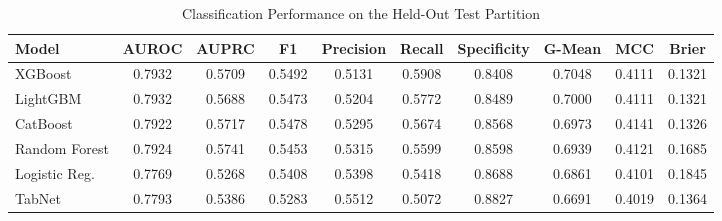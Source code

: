 \begin{table}
\centering
\caption{Classification Performance on the Held-Out Test Partition}
\label{tab:results}
\begin{tabular}{lccccccccc}
\toprule
Model & AUROC & AUPRC & F1 & Precision & Recall & Specificity & G-Mean & MCC & Brier \\
\midrule
XGBoost & 0.7932 & 0.5709 & 0.5492 & 0.5131 & 0.5908 & 0.8408 & 0.7048 & 0.4111 & 0.1321 \\
LightGBM & 0.7932 & 0.5688 & 0.5473 & 0.5204 & 0.5772 & 0.8489 & 0.7000 & 0.4111 & 0.1321 \\
CatBoost & 0.7922 & 0.5717 & 0.5478 & 0.5295 & 0.5674 & 0.8568 & 0.6973 & 0.4141 & 0.1326 \\
Random Forest & 0.7924 & 0.5741 & 0.5453 & 0.5315 & 0.5599 & 0.8598 & 0.6939 & 0.4121 & 0.1685 \\
Logistic Reg. & 0.7769 & 0.5268 & 0.5408 & 0.5398 & 0.5418 & 0.8688 & 0.6861 & 0.4101 & 0.1845 \\
TabNet & 0.7793 & 0.5386 & 0.5283 & 0.5512 & 0.5072 & 0.8827 & 0.6691 & 0.4019 & 0.1364 \\
\bottomrule
\end{tabular}
\end{table}
